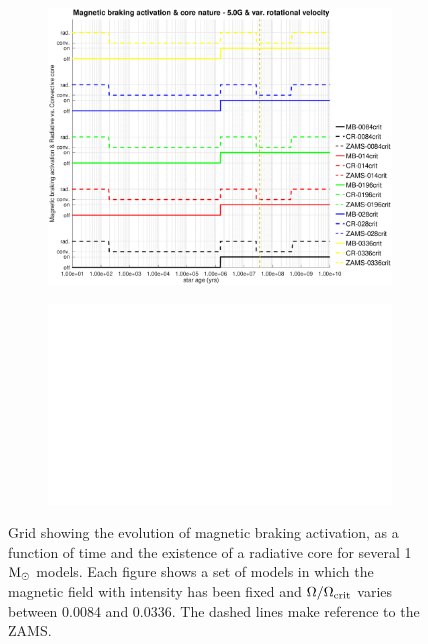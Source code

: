 \documentclass[fleqn,usenatbib]{mnras}
\begin{document}
{{\begin{figure}
\begin{subfigure}[h]{0.47\textwidth}
    \includegraphics[trim = 30mm 15mm 20mm 15mm, clip,width=\textwidth]{figures/mb_act_var_vel_5_0g.eps}
    \label{fig:subim35}
    \end{subfigure}
    \begin{subfigure}[h]{0.47\textwidth}
    \includegraphics[width=\textwidth]{figures/blank.eps}
    \label{fig:subim36}
    \end{subfigure}
\caption{Grid showing the evolution of magnetic braking activation, as a function of time and the existence of a radiative core for several 1 $\mathrm{M}_\odot$ models. Each figure shows a set of models in which the magnetic field with intensity has been fixed and $\Omega / \Omega_{\mathrm{crit}}$ varies between 0.0084 and 0.0336. The dashed lines make reference to the ZAMS.}
\label{fig:grid_mb_act}
\end{figure}




}}
\end{document}
